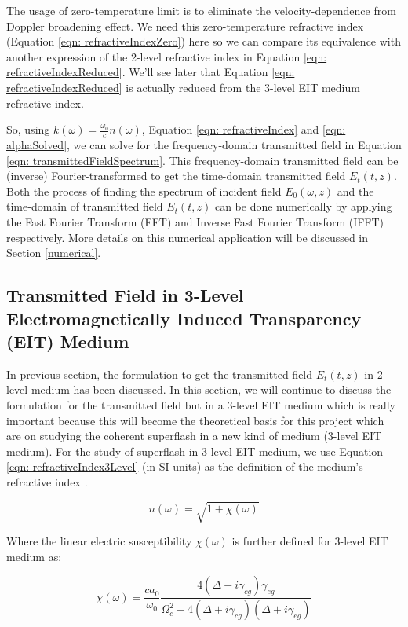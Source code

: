 The usage of zero-temperature limit is to eliminate the velocity-dependence from Doppler broadening effect. We need this zero-temperature refractive index (Equation \ref{eqn: refractiveIndexZero}) here so we can compare its equivalence with another expression of the 2-level refractive index in Equation \ref{eqn: refractiveIndexReduced}. We'll see later that Equation \ref{eqn: refractiveIndexReduced} is actually reduced from the 3-level EIT medium refractive index.

So, using $k(\omega) = \frac{\omega_{0}}{c}n(\omega)$, Equation \ref{eqn: refractiveIndex} and \ref{eqn: alphaSolved}, we can solve for the frequency-domain transmitted field in Equation \ref{eqn: transmittedFieldSpectrum}. This frequency-domain transmitted field can be (inverse) Fourier-transformed to get the time-domain transmitted field $E_{t}(t, z)$. Both the process of finding the spectrum of incident field $E_{0}(\omega, z)$ and the time-domain of transmitted field $E_{t}(t, z)$ can be done numerically by applying the Fast Fourier Transform (FFT) and Inverse Fast Fourier Transform (IFFT) respectively. More details on this numerical application will be discussed in Section \ref{numerical}.

\subsection{Transmitted Field in 3-Level Electromagnetically Induced Transparency (EIT) Medium}
In previous section, the formulation to get the transmitted field $E_{t}(t, z)$ in 2-level medium has been discussed. In this section, we will continue to discuss the formulation for the transmitted field but in a 3-level EIT medium which is really important because this will become the theoretical basis for this project which are on studying the coherent superflash in a new kind of medium (3-level EIT medium). For the study of superflash in 3-level EIT medium, we use Equation \ref{eqn: refractiveIndex3Level} (in SI units) as the definition of the medium's refractive index \cite{Braje2004, Jeong2009}.

\begin{equation}
    n(\omega) = \sqrt{1 + \chi(\omega)}
    \label{eqn: refractiveIndex3Level}
\end{equation}

Where the linear electric susceptibility $\chi(\omega)$ is further defined for 3-level EIT medium as;

\begin{equation}
    \chi(\omega) = \frac{ca_{0}}{\omega_{0}} \frac{4(\Delta + i\gamma_{cg})\gamma_{eg}}{\Omega_{c}^{2} - 4(\Delta + i\gamma_{cg})(\Delta + i\gamma_{eg})}
    \label{eqn: chi(w)}
\end{equation}

